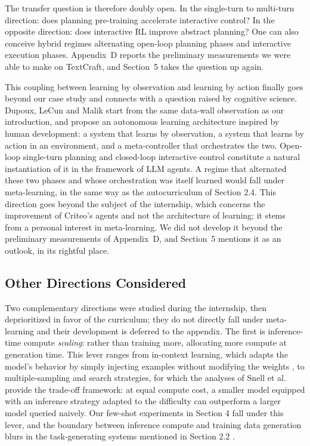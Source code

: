 \documentclass[11pt,a4paper]{article}
\begin{document}
The transfer question is therefore doubly open. In the single-turn to multi-turn direction: does planning pre-training accelerate interactive control? In the opposite direction: does interactive RL improve abstract planning? One can also conceive hybrid regimes alternating open-loop planning phases and interactive execution phases. Appendix~D reports the preliminary measurements we were able to make on TextCraft, and Section~5 takes the question up again.


This coupling between learning by observation and learning by action finally goes beyond our case study and connects with a question raised by cognitive science. Dupoux, LeCun and Malik \cite{dupoux2026why} start from the same data-wall observation as our introduction, and propose an autonomous learning architecture inspired by human development: a system that learns by observation, a system that learns by action in an environment, and a meta-controller that orchestrates the two. Open-loop single-turn planning and closed-loop interactive control constitute a natural instantiation of it in the framework of LLM agents. A regime that alternated these two phases and whose orchestration was itself learned would fall under meta-learning, in the same way as the autocurriculum of Section 2.4. This direction goes beyond the subject of the internship, which concerns the improvement of Criteo's agents and not the architecture of learning; it stems from a personal interest in meta-learning. We did not develop it beyond the preliminary measurements of Appendix~D, and Section~5 mentions it as an outlook, in its rightful place.


\subsection{Other Directions Considered}

Two complementary directions were studied during the internship, then deprioritized in favor of the curriculum; they do not directly fall under meta-learning and their development is deferred to the appendix. The first is inference-time compute \emph{scaling}: rather than training more, allocating more compute at generation time. This lever ranges from in-context learning, which adapts the model's behavior by simply injecting examples without modifying the weights \cite{brown2020gpt3}, to multiple-sampling and search strategies, for which the analyses of Snell et al. \cite{snell2024scaling} provide the trade-off framework: at equal compute cost, a smaller model equipped with an inference strategy adapted to the difficulty can outperform a larger model queried naively. Our few-shot experiments in Section 4 fall under this lever, and the boundary between inference compute and training data generation blurs in the task-generating systems mentioned in Section 2.2 \cite{zhou2025sca, dreamgym2025}.
\end{document}
